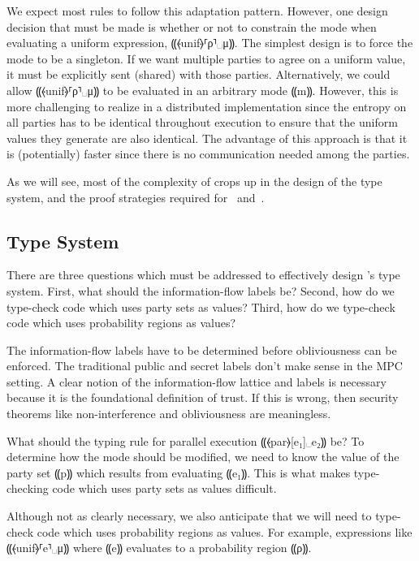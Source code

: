 We expect most rules to follow this adaptation pattern. However, one design decision
that must be made is whether or not to constrain the mode when evaluating a uniform
expression, ⸨⦑unif⦒⸢ρ⸣␣μ⸩. The simplest design is to force the mode to be a singleton.
If we want multiple parties to agree on a uniform value, it must be explicitly sent (shared)
with those parties. Alternatively, we could allow ⸨⦑unif⦒⸢ρ⸣␣μ⸩ to be evaluated in an arbitrary
mode ⸨m⸩. However, this is more challenging to realize in a distributed implementation since the
entropy on all parties has to be identical throughout execution to ensure that the uniform values
they generate are also identical. The advantage of this approach is that it is (potentially) faster
since there is no communication needed among the parties.

As we will see, most of the complexity of \lang crops up in the design of the type system, and the
proof strategies required for~ and~.

\subsection{Type System}
\label{subsec:proposal-design-types}

There are three questions which must be addressed to effectively
design \lang's type system. First, what should the information-flow
labels be? Second, how do we type-check code which uses party sets as values?
Third, how do we type-check code which uses probability regions as values?

The information-flow labels have to be determined before obliviousness
can be enforced. The traditional public and secret labels don't make
sense in the MPC setting. A clear notion of the information-flow
lattice and labels is necessary because it is the foundational
definition of trust. If this is wrong, then security
theorems like non-interference and obliviousness are meaningless.

What should the typing rule for parallel execution ⸨⦑par⦒[e₁]␣e₂⸩ be?
To determine how the mode should be modified, we need to know the value
of the party set ⸨p⸩ which results from evaluating ⸨e₁⸩. This is what
makes type-checking code which uses party sets as values difficult.

Although not as clearly necessary, we also anticipate that we will
need to type-check code which uses probability regions as values.
For example, expressions like ⸨⦑unif⦒⸢e⸣␣μ⸩ where ⸨e⸩ evaluates
to a probability region ⸨ρ⸩.

